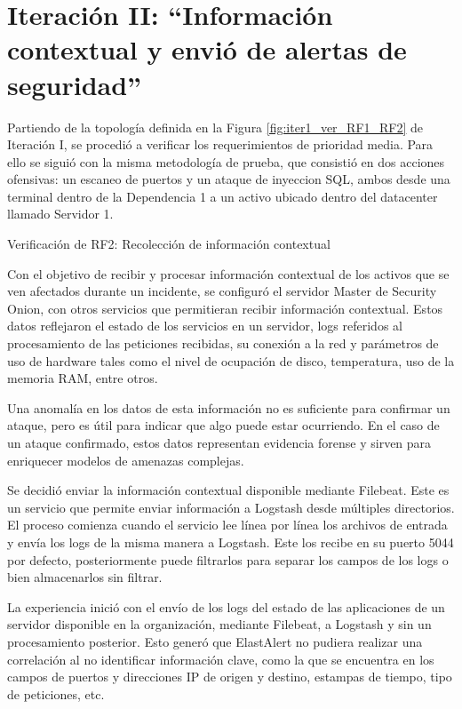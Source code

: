 \chapter{\Large Iteración II: “Información contextual y envió de alertas de seguridad”}
\label{iteracion2}
    Partiendo de la topología definida en la Figura \ref{fig:iter1_ver_RF1_RF2} de Iteración I, se procedió a verificar los requerimientos de prioridad media. Para ello se siguió con la misma metodología de prueba, que consistió en dos acciones ofensivas: un escaneo de puertos y un ataque de inyeccion SQL, ambos desde una terminal dentro de la Dependencia 1 a un activo ubicado dentro del datacenter llamado Servidor 1.
    \begin{section}{Verificación de RF2: Recolección de información contextual}
    
    Con el objetivo de recibir y procesar información contextual de los activos que se ven afectados durante un incidente, se configuró el servidor Master de Security Onion, con otros servicios que permitieran recibir información contextual. Estos datos reflejaron el estado de los servicios en un servidor, logs referidos al procesamiento de las peticiones recibidas, su conexión a la red y parámetros de uso de hardware tales como el nivel de ocupación de disco, temperatura, uso de la memoria RAM, entre otros.  \par
    Una anomalía en los datos de esta información no es suficiente para confirmar un ataque, pero es útil para indicar que algo puede estar ocurriendo. En el caso de un ataque confirmado, estos datos representan evidencia forense y sirven para enriquecer modelos de amenazas complejas. \par
    Se decidió enviar la información contextual disponible mediante Filebeat. Este es un servicio que permite enviar información a Logstash desde múltiples directorios. El proceso comienza cuando el servicio lee línea por línea los archivos de entrada y envía los logs de la misma manera a Logstash. Este los recibe en su puerto 5044 por defecto, posteriormente puede filtrarlos para separar los campos de los logs o bien almacenarlos sin filtrar. \par
    La experiencia inició con el envío de los logs del estado de las aplicaciones de un servidor disponible en la organización, mediante Filebeat, a Logstash y sin un procesamiento posterior. Esto generó que ElastAlert no pudiera realizar una correlación al no identificar información clave, como la que se encuentra en los campos de puertos y direcciones IP de origen y destino, estampas de tiempo, tipo de peticiones, etc.\par

\end{section}
